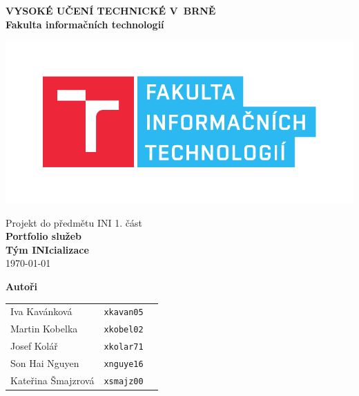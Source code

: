 \begin{titlepage}

    \centering

    {\fontsize{20pt}{15pt}\bfseries
    VYSOKÉ UČENÍ TECHNICKÉ V~BRNĚ\\
    \vspace{8pt}
    Fakulta informačních technologií
    }


    \includegraphics[scale=0.7]{./assets/fit-logo.pdf}

    \vspace{22pt}

    {\Large Projekt do předmětu INI 1. část\\}
    \vspace{4pt}
    {\LARGE \bfseries Portfolio služeb\\}
    \vspace{90pt}
    {\Large \bfseries Tým INIcializace\\}
    \vspace{90pt}
    {\Large \today}

    \vspace{90pt}
    {\Large \bfseries Autoři\\}
    \vspace{12pt}

    \begin{tabular}{ l c r }
        Iva Kavánková & \texttt{xkavan05} \\
        Martin Kobelka & \texttt{xkobel02} \\
        Josef Kolář & \texttt{xkolar71} \\
        Son Hai Nguyen & \texttt{xnguye16} \\
        Kateřina Šmajzrová & \texttt{xsmajz00} \\
    \end{tabular}\\

\end{titlepage}